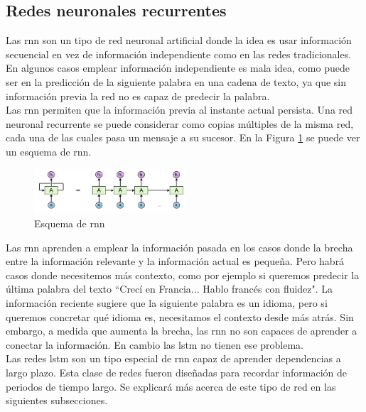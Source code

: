 \subsection{Redes neuronales recurrentes}

Las \acrfull{rnn} son un tipo de red neuronal artificial donde la idea es usar información secuencial en vez de información independiente como en las redes tradicionales. En algunos casos emplear información independiente es mala idea, como puede ser en la predicción de la siguiente palabra en una cadena de texto, ya que sin información previa la red no es capaz de predecir la palabra.\\

Las \acrshort{rnn} permiten que la información previa al instante actual persista. Una red neuronal recurrente se puede considerar como copias múltiples de la misma red, cada una de las cuales pasa un mensaje a su sucesor. En la Figura \ref{fig.rnn} se puede ver un esquema de \acrshort{rnn}.\\

\begin{figure}[H]
  \begin{center}
    \includegraphics[width=0.5\textwidth]{figures/Introduccion/esquema_rnn.png}
		\caption{Esquema de \acrfull{rnn}}
		\label{fig.rnn}
		\end{center}
\end{figure}

Las \acrfull{rnn} aprenden a emplear la información pasada en los casos donde la brecha entre la información relevante y la información actual es pequeña. Pero habrá casos donde necesitemos más contexto, como por ejemplo si queremos predecir la última palabra del texto ``Crecí en Francia... Hablo francés con fluidez". La información reciente sugiere que la siguiente palabra es un idioma, pero si queremos concretar qué idioma es, necesitamos el contexto desde más atrás. Sin embargo, a medida que aumenta la brecha, las \acrshort{rnn} no son capaces de aprender a conectar la información. En cambio las \acrshort{lstm} no tienen ese problema.\\

Las redes \acrfull{lstm} \cite{lstm} son un tipo especial de \acrshort{rnn} capaz de aprender dependencias a largo plazo. Esta clase de redes fueron diseñadas para recordar información de periodos de tiempo largo. Se explicará más acerca de este tipo de red en las siguientes subsecciones.\\



